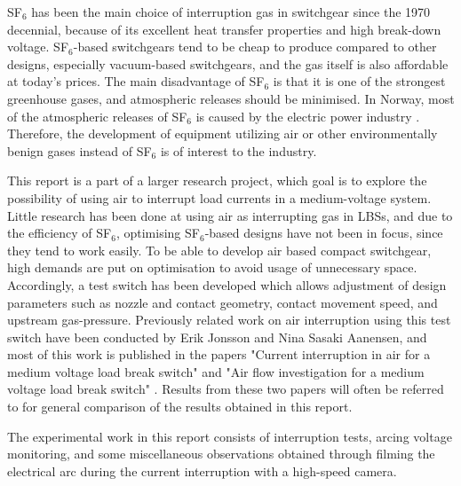 \documentclass[10pt,b5paper,twoside]{article}
\begin{document}
SF$_6$ has been the main choice of interruption gas in switchgear since the 1970 decennial, because of its excellent heat transfer properties and high break-down voltage. SF$_6$-based switchgears tend to be cheap to produce compared to other designs, especially vacuum-based switchgears, and the gas itself is also affordable at today's prices. The main disadvantage of SF$_6$ is that it is one of the strongest greenhouse gases, and atmospheric releases should be minimised. In Norway, most of the atmospheric releases of SF$_6$ is caused by the electric power industry \cite{bib:StatSF6}. Therefore, the development of equipment utilizing air or other environmentally benign gases instead of SF$_6$ is of interest to the industry.

This report is a part of a larger research project, which goal is to explore the possibility of using air to interrupt load currents in a medium-voltage system. Little research has been done at using air as interrupting gas in LBSs, and due to the efficiency of SF$_6$, optimising SF$_6$-based designs have not been in focus, since they tend to work easily. To be able to develop air based compact switchgear, high demands are put on optimisation to avoid usage of unnecessary space. Accordingly, a test switch has been developed which allows adjustment of design parameters such as nozzle and contact geometry, contact movement speed, and upstream gas-pressure. Previously related work on air interruption using this test switch have been conducted by Erik Jonsson and Nina Sasaki Aanensen, and most of this work is published in the papers "Current interruption in air for a medium voltage load break switch" \cite{bib:CIAMVLBS} and "Air flow investigation for a medium voltage load break switch" \cite{bib:AFIMVLBA}. Results from these two papers will often be referred to for general comparison of the results obtained in this report.

The experimental work in this report consists of interruption tests, arcing voltage monitoring, and some miscellaneous observations obtained through filming the electrical arc during the current interruption with a high-speed camera.
\end{document}
